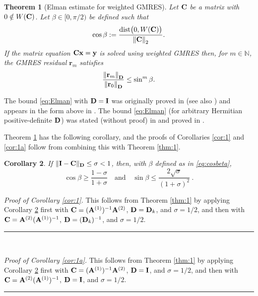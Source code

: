\documentclass[10pt]{article}%
\newtheorem{theorem}{Theorem}[section]
\newtheorem{corollary}[theorem]{Corollary}
\newenvironment{proof}[1][Proof]{\noindent \emph{#1.} }
{\hfill \ \rule{0.5em}{0.5em}}
\numberwithin{equation}{section}
\newcommand{\beq}{\begin{equation}}
\newcommand{\eeq}{\end{equation}}
\newcommand{\bpf}{\begin{proof}}
\newcommand{\epf}{\end{proof}}
\newcommand{\bx}{\mathbf{x}}
\newcommand{\bfr}{\mathbf{r}}
\newcommand{\br}{\mathbf{r}}
\newcommand{\by}{\mathbf{y}}
\newcommand*{\N}[1]{\left\|#1\right\|}
\newcommand{\matrixI}{{\bf I}}
\newcommand{\matrixC}{{\bf C}}
\newcommand{\matrixD}{{\bf D}}
\newcommand{\matrixAo}{{\bf A}^{(1)}}
\newcommand{\matrixAt}{{\bf A}^{(2)}}
\begin{document}

\begin{theorem}[Elman estimate for weighted GMRES]\label{thm:GMRES1_intro} 
Let $\matrixC$ be a matrix with $0\notin W(\matrixC)$. Let $\beta\in[0,\pi/2)$ be defined such that
\beq\label{eq:cosbeta}
\cos \beta := \frac{\mathrm{dist}\big(0, W(\matrixC)\big)}{\N{\matrixC}_{2}}.
\eeq
If the matrix equation $\matrixC \bx = \by$ is solved using weighted GMRES then, 
for $m\in \mathbb{N}$, the GMRES residual $\br_m$ %
satisfies
\beq\label{eq:Elman}
\frac{\N{\bfr_m}_{\matrixD}}{\N{\bfr_0}_{\matrixD}} \leq \sin^m \beta. %
\eeq
\end{theorem}
The bound \eqref{eq:Elman} with $\matrixD=\matrixI$ was originally proved in \cite{El:82} (see also \cite[Theorem 3.3]{EiElSc:83}) and appears in the form above in \cite[Equation 1.2]{BeGoTy:06}. The bound \eqref{eq:Elman} (for arbitrary Hermitian positive-definite $\matrixD$) was stated (without proof) in \cite{CaWi:92} and proved in \cite[Theorem 5.1]{GrSpVa:17}. %



Theorem \ref{thm:GMRES1_intro} has the following corollary, and the proofs of Corollaries \ref{cor:1} and \ref{cor:1a} follow from combining this with Theorem \ref{thm:1}.

\begin{corollary}
\label{cor:GMRES_intro} 
If $\|\matrixI - \matrixC \|_\matrixD \leq \sigma < 1$, then, with $\beta$ defined as in \eqref{eq:cosbeta},
$$\cos \beta \geq \frac{1-\sigma}{1+\sigma} \quad \text{and} \quad
\sin \beta \leq \frac{2 \sqrt{\sigma}}{(1+\sigma)^2} \ . $$
\end{corollary}

\bpf[Proof of Corollary \ref{cor:1}]
This follows from Theorem \ref{thm:1} by applying Corollary \ref{cor:GMRES_intro} first with $\matrixC= (\matrixAo)^{-1} \matrixAt$, $\matrixD=\matrixD_k$, and $\sigma=1/2$, and then with $\matrixC= \matrixAt(\matrixAo)^{-1} $, $\matrixD=(\matrixD_k)^{-1}$, and $\sigma=1/2$.
\epf

\

\bpf[Proof of Corollary \ref{cor:1a}]
This follows from Theorem \ref{thm:1} by applying Corollary \ref{cor:GMRES_intro} first with $\matrixC= (\matrixAo)^{-1} \matrixAt$, $\matrixD=\matrixI$, and $\sigma=1/2$, and then with $\matrixC= \matrixAt(\matrixAo)^{-1} $, $\matrixD=\matrixI$, and $\sigma=1/2$.
\epf
\end{document}
